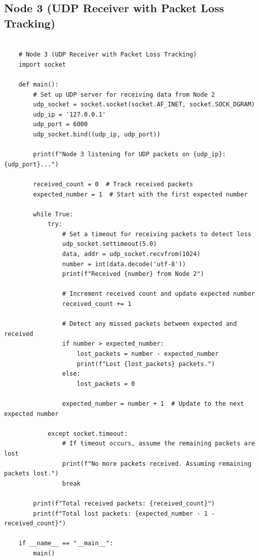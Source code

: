 \documentclass{article}
\begin{document}
\subsection{Node 3 (UDP Receiver with Packet Loss Tracking)}
\begin{lstlisting}[style=python]

    # Node 3 (UDP Receiver with Packet Loss Tracking)
    import socket
    
    def main():
        # Set up UDP server for receiving data from Node 2
        udp_socket = socket.socket(socket.AF_INET, socket.SOCK_DGRAM)
        udp_ip = '127.0.0.1'
        udp_port = 6000
        udp_socket.bind((udp_ip, udp_port))
    
        print(f"Node 3 listening for UDP packets on {udp_ip}:{udp_port}...")
    
        received_count = 0  # Track received packets
        expected_number = 1  # Start with the first expected number
    
        while True:
            try:
                # Set a timeout for receiving packets to detect loss
                udp_socket.settimeout(5.0)
                data, addr = udp_socket.recvfrom(1024)
                number = int(data.decode('utf-8'))
                print(f"Received {number} from Node 2")
    
                # Increment received count and update expected number
                received_count += 1
    
                # Detect any missed packets between expected and received
                if number > expected_number:
                    lost_packets = number - expected_number
                    print(f"Lost {lost_packets} packets.")
                else:
                    lost_packets = 0
    
                expected_number = number + 1  # Update to the next expected number
    
            except socket.timeout:
                # If timeout occurs, assume the remaining packets are lost
                print(f"No more packets received. Assuming remaining packets lost.")
                break
    
        print(f"Total received packets: {received_count}")
        print(f"Total lost packets: {expected_number - 1 - received_count}")
    
    if __name__ == "__main__":
        main()
    

\end{lstlisting}
\end{document}
